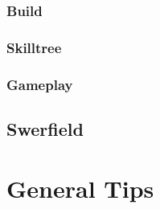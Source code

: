 \documentclass[12pt]{article}
\begin{document}
\subsubsection{Build}
\subsubsection{Skilltree}
\subsubsection{Gameplay}

\subsection{Swerfield}


\section{General Tips}
\end{document}
